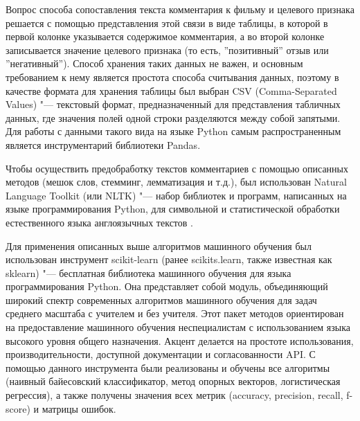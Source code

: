 \documentclass[bachelor, och, coursework]{SCWorks}
\begin{document}
        Вопрос способа сопоставления текста комментария к фильму и целевого
        признака решается с помощью представления этой связи в виде таблицы, в
        которой в первой колонке указывается содержимое комментария, а во второй
        колонке записывается значение целевого признака (то есть, ''позитивный''
        отзыв или ''негативный''). Способ хранения таких данных не важен, и
        основным требованием к нему является простота способа считывания данных,
        поэтому в качестве формата для хранения таблицы был выбран CSV
        (Comma-Separated Values) "--- текстовый формат, предназначенный для
        представления табличных данных, где значения полей одной строки
        разделяются между собой запятыми. Для работы с данными такого вида на
        языке Python самым распространенным является инструментарий библиотеки
        Pandas.

        Чтобы осуществить предобработку текстов комментариев с помощью описанных
        методов (мешок слов, стемминг, лемматизация и т.д.), был использован
        Natural Language Toolkit (или NLTK) "--- набор библиотек и программ,
        написанных на языке программирования Python, для символьной и
        статистической обработки естественного языка англоязычных текстов
        \cite{fwnltk}. 

        Для применения описанных выше алгоритмов машинного обучения был
        использован инструмент scikit-learn (ранее scikits.learn, также
        известная как sklearn) "--- бесплатная библиотека машинного обучения для
        языка программирования Python. Она представляет собой модуль,
        объединяющий широкий спектр современных алгоритмов машинного обучения
        для задач среднего масштаба с учителем и без учителя. Этот пакет методов
        ориентирован на предоставление машинного обучения неспециалистам с
        использованием языка высокого уровня общего назначения. Акцент делается
        на простоте использования, производительности, доступной документации и
        согласованности API. С помощью данного инструмента были реализованы и
        обучены все алгоритмы (наивный байесовский классификатор, метод опорных
        векторов, логистическая регрессия), а также получены значения всех
        метрик (accuracy, precision, recall, f-score) и матрицы ошибок.
\end{document}
